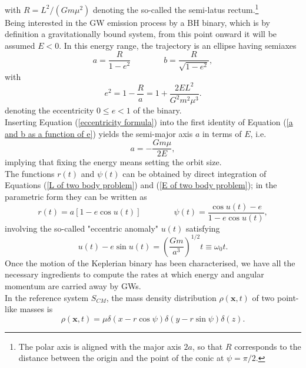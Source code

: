 \documentclass[12pt,twoside,openany]{book}
\begin{document}
with $R=L^2/(Gm\mu^2)$ denoting the so-called the semi-latus rectum.\footnote{The polar axis is aligned with the major axis $2a$, so that $R$ corresponds to the distance between the origin and the point of the conic at $\psi=\pi/2$.}\\Being interested in the GW emission process by a BH binary, which is by definition a gravitationally bound system, from this point onward it will be assumed $E<0$. In this energy range, the trajectory is an ellipse having semiaxes
\begin{equation}\label{a and b as a function of e}
    a=\frac{R}{1-e^2} \qquad \qquad b=\frac{R}{\sqrt{1-e^2}},
\end{equation}
with
\begin{equation}\label{eccentricity formula}
    e^2=1-\frac{R}{a}=1+\frac{2EL^2}{G^2m^2\mu^3}.
\end{equation}
denoting the eccentricity $0\le e<1$ of the binary.\\Inserting Equation (\ref{eccentricity formula}) into the first identity of Equation (\ref{a and b as a function of e}) yields the semi-major axis $a$ in terms of $E$, i.e.
\begin{equation}\label{a as a function of E}
    a=-\frac{Gm\mu}{2E},
\end{equation}
implying that fixing the energy means setting the orbit size.\\The functions $r(t)$ and $\psi(t)$ can be obtained by direct integration of Equations (\ref{L of two body problem}) and (\ref{E of two body problem}); in the parametric form they can be written as
\begin{equation}
    r(t)=a[1-e\cos{u(t)}] \qquad \qquad\psi(t)=\frac{\cos{u(t)}-e}{1-e\cos{u(t)}},
\end{equation}
involving the so-called "eccentric anomaly" $u(t)$ satisfying
\begin{equation}
    u(t)-e\sin{u(t)}=\left(\frac{Gm}{a^3}\right)^{1/2}t\equiv \omega_0 t.
\end{equation}
Once the motion of the Keplerian binary has been characterised, we have all the necessary ingredients to compute the rates at which energy and angular momentum are carried away by GWs.\\In the reference system $S_{CM}$, the mass density distribution $\rho(\mathbf{x},t)$ of two point-like masses is
\begin{equation}
 \rho(\mathbf{x},t)=\mu\delta(x-r\cos{\psi})\delta(y-r\sin{\psi})\delta(z).
\end{equation}
\end{document}
